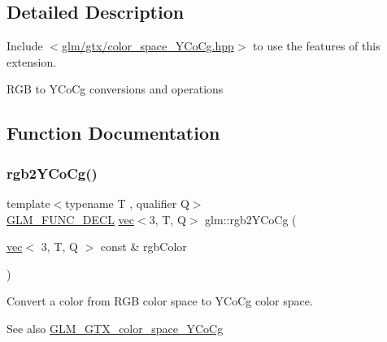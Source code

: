 \subsection{Detailed Description}
Include $<$\mbox{\hyperlink{color__space___y_co_cg_8hpp}{glm/gtx/color\+\_\+space\+\_\+\+Y\+Co\+Cg.\+hpp}}$>$ to use the features of this extension.

R\+GB to Y\+Co\+Cg conversions and operations 

\subsection{Function Documentation}
\mbox{\label{group__gtx__color__space___y_co_cg_ga0606353ec2a9b9eaa84f1b02ec391bc5}} 
\subsubsection{\texorpdfstring{rgb2\+Y\+Co\+Cg()}{rgb2YCoCg()}}
{\footnotesize\ttfamily template$<$typename T , qualifier Q$>$ \\
\mbox{\hyperlink{setup_8hpp_ab2d052de21a70539923e9bcbf6e83a51}{G\+L\+M\+\_\+\+F\+U\+N\+C\+\_\+\+D\+E\+CL}} \mbox{\hyperlink{structglm_1_1vec}{vec}}$<$3, T, Q$>$ glm\+::rgb2\+Y\+Co\+Cg (\begin{DoxyParamCaption}\item[{\mbox{\hyperlink{structglm_1_1vec}{vec}}$<$ 3, T, Q $>$ const \&}]{rgb\+Color }\end{DoxyParamCaption})}

Convert a color from R\+GB color space to Y\+Co\+Cg color space. \begin{DoxySeeAlso}{See also}
\mbox{\hyperlink{group__gtx__color__space___y_co_cg}{G\+L\+M\+\_\+\+G\+T\+X\+\_\+color\+\_\+space\+\_\+\+Y\+Co\+Cg}} 
\end{DoxySeeAlso}
\mbox{\label{group__gtx__color__space___y_co_cg_ga0389772e44ca0fd2ba4a79bdd8efe898}} 
